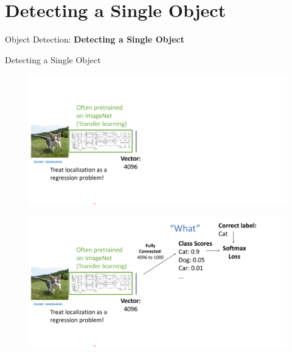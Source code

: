 \section{Detecting a Single Object}
\begin{frame}{}
    \LARGE Object Detection: \textbf{Detecting a Single Object}
\end{frame}

\begin{frame}[allowframebreaks]{Detecting a Single Object}
    \begin{figure}
        \centering
        \includegraphics[width=1.0\textwidth,height=1.0\textheight,keepaspectratio]{images/object-detect/object_3.png}
    \end{figure}

\framebreak

    \begin{figure}
        \centering
        \includegraphics[width=1.0\textwidth,height=1.0\textheight,keepaspectratio]{images/object-detect/object_4.png}
    \end{figure}

\framebreak


\end{frame}
